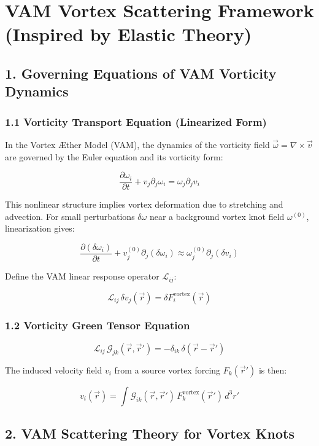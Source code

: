 

\chapter*{VAM Vortex Scattering Framework (Inspired by Elastic Theory)}

\section*{1. Governing Equations of VAM Vorticity Dynamics}

\subsection*{1.1 Vorticity Transport Equation (Linearized Form)}

In the Vortex Æther Model (VAM), the dynamics of the vorticity field \(\vec{\omega} = \nabla \times \vec{v}\) are governed by the Euler equation and its vorticity form:

\[
\frac{\partial \omega_i}{\partial t} + v_j \partial_j \omega_i = \omega_j \partial_j v_i
\]

This nonlinear structure implies vortex deformation due to stretching and advection. For small perturbations \(\delta\omega\) near a background vortex knot field \(\omega^{(0)}\), linearization gives:

\[
\frac{\partial (\delta \omega_i)}{\partial t} + v_j^{(0)} \partial_j (\delta \omega_i) \approx \omega_j^{(0)} \partial_j (\delta v_i)
\]

Define the VAM linear response operator \(\mathcal{L}_{ij}\):

\[
\mathcal{L}_{ij} \, \delta v_j(\vec{r}) = \delta F_i^{\text{vortex}}(\vec{r})
\]

\subsection*{1.2 Vorticity Green Tensor Equation}

\[
\mathcal{L}_{ij} \, \mathcal{G}_{jk}(\vec{r}, \vec{r}') = -\delta_{ik} \, \delta(\vec{r} - \vec{r}')
\]

The induced velocity field \(v_i\) from a source vortex forcing \(F_k(\vec{r}')\) is then:

\[
v_i(\vec{r}) = \int \mathcal{G}_{ik}(\vec{r}, \vec{r}') \, F_k^{\text{vortex}}(\vec{r}') \, d^3 r'
\]

\section*{2. VAM Scattering Theory for Vortex Knots}

